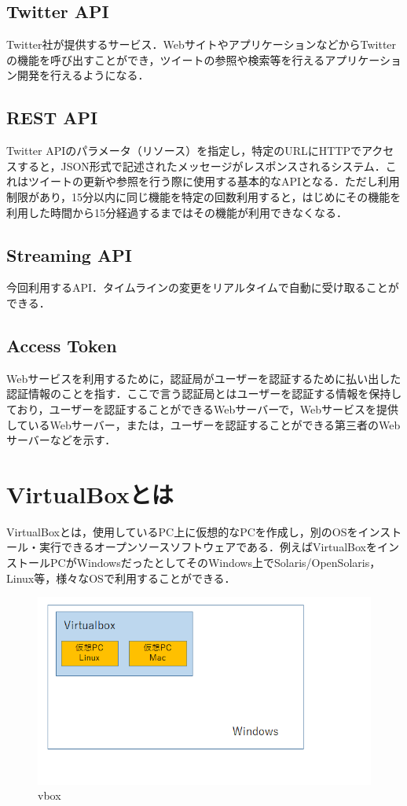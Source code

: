 \subsection{Twitter API}
Twitter社が提供するサービス．WebサイトやアプリケーションなどからTwitterの機能を呼び出すことができ，ツイートの参照や検索等を行えるアプリケーション開発を行えるようになる．

\subsection{REST API}
Twitter APIのパラメータ（リソース）を指定し，特定のURLにHTTPでアクセスすると，JSON形式で記述されたメッセージがレスポンスされるシステム．これはツイートの更新や参照を行う際に使用する基本的なAPIとなる．ただし利用制限があり，15分以内に同じ機能を特定の回数利用すると，はじめにその機能を利用した時間から15分経過するまではその機能が利用できなくなる．

\subsection{Streaming API}
今回利用するAPI．タイムラインの変更をリアルタイムで自動に受け取ることができる．

\subsection{Access Token}
Webサービスを利用するために，認証局がユーザーを認証するために払い出した認証情報のことを指す．ここで言う認証局とはユーザーを認証する情報を保持しており，ユーザーを認証することができるWebサーバーで，Webサービスを提供しているWebサーバー，または，ユーザーを認証することができる第三者のWebサーバーなどを示す．

\section{VirtualBoxとは}
VirtualBoxとは，使用しているPC上に仮想的なPCを作成し，別のOSをインストール・実行できるオープンソースソフトウェアである．例えばVirtualBoxをインストールPCがWindowsだったとしてそのWindows上でSolaris/OpenSolaris，Linux等，様々なOSで利用することができる\cite{c}．

\begin{figure}[htb]
\centering
\includegraphics[width=15cm]{vbox.png}
\caption{vbox}\label{vbox}
\end{figure}

